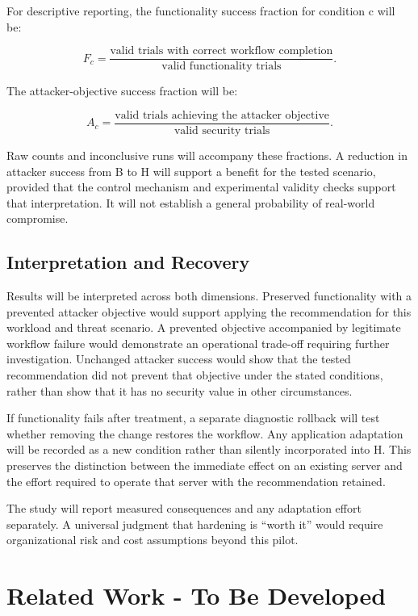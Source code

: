 \documentclass[12pt,letterpaper]{article}
\begin{document}
For descriptive reporting, the functionality success fraction for condition c will be:

\begin{equation}
F_c = \frac{\text{valid trials with correct workflow completion}}{\text{valid functionality trials}}.
\end{equation}

The attacker-objective success fraction will be:

\begin{equation}
A_c = \frac{\text{valid trials achieving the attacker objective}}{\text{valid security trials}}.
\end{equation}

Raw counts and inconclusive runs will accompany these fractions. A reduction in attacker success from B to H will support a benefit for the tested scenario, provided that the control mechanism and experimental validity checks support that interpretation. It will not establish a general probability of real-world compromise.
\subsection{Interpretation and Recovery}
\label{sec:org44e29a6}

Results will be interpreted across both dimensions. Preserved functionality with a prevented attacker objective would support applying the recommendation for this workload and threat scenario. A prevented objective accompanied by legitimate workflow failure would demonstrate an operational trade-off requiring further investigation. Unchanged attacker success would show that the tested recommendation did not prevent that objective under the stated conditions, rather than show that it has no security value in other circumstances.

If functionality fails after treatment, a separate diagnostic rollback will test whether removing the change restores the workflow. Any application adaptation will be recorded as a new condition rather than silently incorporated into H. This preserves the distinction between the immediate effect on an existing server and the effort required to operate that server with the recommendation retained.

The study will report measured consequences and any adaptation effort separately. A universal judgment that hardening is ``worth it'' would require organizational risk and cost assumptions beyond this pilot.
\section{Related Work - To Be Developed}
\label{sec:org76b829b}
\end{document}
